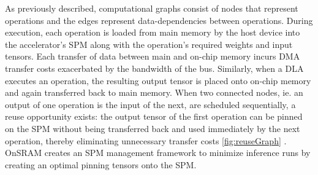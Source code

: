 

As previously described, computational graphs consist of nodes that represent
operations and the edges represent data-dependencies between operations. During
execution, each operation is loaded from main memory by the host device into
the accelerator's SPM along with the operation's required weights and input
tensors. Each transfer of data between main and on-chip memory incurs DMA
transfer costs exacerbated by the bandwidth of the bus. Similarly, when a DLA
executes an operation, the resulting output tensor is placed onto on-chip
memory and again transferred back to main memory. When two connected nodes,
ie. an output of one operation is the input of the next, are scheduled
sequentially, a reuse opportunity exists: the output tensor of the first
operation can be pinned on the SPM without being transferred back and used
immediately by the next operation, thereby eliminating unnecessary transfer
costs \ref{fig:reuseGraph} . OnSRAM creates an SPM management framework to minimize inference runs
by creating an optimal pinning tensors onto the SPM.


